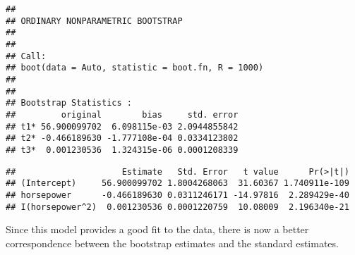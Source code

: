 \documentclass[]{article}
\newenvironment{Shaded}{\begin{snugshade}}{\end{snugshade}}
\newcommand{\KeywordTok}[1]{\textcolor[rgb]{0.13,0.29,0.53}{\textbf{#1}}}
\newcommand{\DataTypeTok}[1]{\textcolor[rgb]{0.13,0.29,0.53}{#1}}
\newcommand{\DecValTok}[1]{\textcolor[rgb]{0.00,0.00,0.81}{#1}}
\newcommand{\OperatorTok}[1]{\textcolor[rgb]{0.81,0.36,0.00}{\textbf{#1}}}
\newcommand{\NormalTok}[1]{#1}
\begin{document}
\begin{verbatim}
## 
## ORDINARY NONPARAMETRIC BOOTSTRAP
## 
## 
## Call:
## boot(data = Auto, statistic = boot.fn, R = 1000)
## 
## 
## Bootstrap Statistics :
##         original        bias     std. error
## t1* 56.900099702  6.098115e-03 2.0944855842
## t2* -0.466189630 -1.777108e-04 0.0334123802
## t3*  0.001230536  1.324315e-06 0.0001208339
\end{verbatim}

\begin{Shaded}
\end{Shaded}

\begin{verbatim}
##                     Estimate   Std. Error   t value      Pr(>|t|)
## (Intercept)     56.900099702 1.8004268063  31.60367 1.740911e-109
## horsepower      -0.466189630 0.0311246171 -14.97816  2.289429e-40
## I(horsepower^2)  0.001230536 0.0001220759  10.08009  2.196340e-21
\end{verbatim}

Since this model provides a good fit to the data, there is now a better
correspondence between the bootstrap estimates and the standard
estimates.
\end{document}
